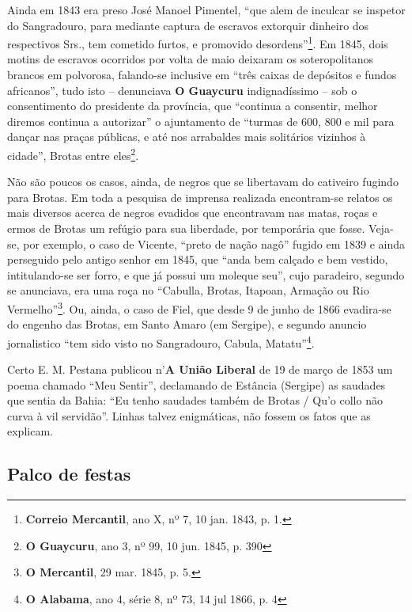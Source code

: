 Ainda em 1843 era preso José Manoel Pimentel, ``que alem de inculcar se inspetor do Sangradouro, para mediante captura de escravos extorquir dinheiro dos respectivos Srs., tem cometido furtos, e promovido desordens''\footnote{\textbf{Correio Mercantil}, ano X, nº 7, 10 jan. 1843, p. 1.}. Em 1845, dois motins de escravos ocorridos por volta de maio deixaram os soteropolitanos brancos em polvorosa, falando-se inclusive em ``três caixas de depósitos e fundos africanos'', tudo isto -- denunciava \textbf{O Guaycuru} indignadíssimo -- sob o consentimento do presidente da província, que ``continua a consentir, melhor diremos continua a autorizar'' o ajuntamento de ``turmas de  600, 800 e mil para dançar nas praças públicas, e até nos arrabaldes mais solitários vizinhos à cidade'', Brotas entre eles\footnote{\textbf{O Guaycuru}, ano 3, nº 99, 10 jun. 1845, p. 390}.

Não são poucos os casos, ainda, de negros que se libertavam do cativeiro fugindo para Brotas. Em toda a pesquisa de imprensa realizada encontram-se relatos os mais diversos acerca de negros evadidos que encontravam nas matas, roças e ermos de Brotas um refúgio para sua liberdade, por temporária que fosse. Veja-se, por exemplo, o caso de Vicente, ``preto de nação nagô'' fugido em 1839 e ainda perseguido pelo antigo senhor em 1845, que ``anda bem calçado e bem vestido, intitulando-se ser forro, e que já possui um moleque seu'', cujo paradeiro, segundo se anunciava, era uma roça no ``Cabulla, Brotas, Itapoan, Armação ou Rio Vermelho''\footnote{\textbf{O Mercantil}, 29 mar. 1845, p. 5.}. Ou, ainda, o caso de Fiel, que desde 9 de junho de 1866 evadira-se do engenho das Brotas, em Santo Amaro (em Sergipe), e segundo anuncio jornalistico ``tem sido visto no Sangradouro, Cabula, Matatu''\footnote{\textbf{O Alabama}, ano 4, série 8, nº 73, 14 jul 1866, p. 4}. 

Certo E. M. Pestana publicou n'\textbf{A União Liberal} de 19 de março de 1853 um poema chamado ``Meu Sentir'', declamando de Estância (Sergipe) as saudades que sentia da Bahia: ``Eu tenho saudades também de Brotas / Qu'o collo não curva à vil servidão''. Linhas talvez enigmáticas, não fossem os fatos que as explicam.

\subsection{Palco de festas}

